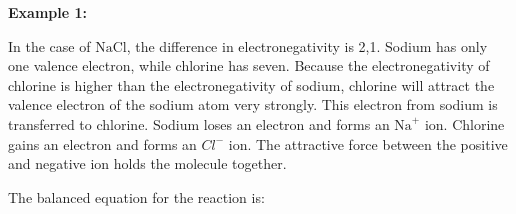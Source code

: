         \label{m38684*id142248}
          \textbf{Example 1:}
        \par 
        \label{m38684*id142255}In the case of \begin{math}\mathrm{NaCl}\end{math}, the difference in electronegativity is 2,1. Sodium has only one valence electron, while chlorine has seven. Because the electronegativity of chlorine is higher than the electronegativity of sodium, chlorine will attract the valence electron of the sodium atom very strongly. This electron from sodium is transferred to chlorine. Sodium loses an electron and forms an \begin{math}{\mathrm{Na}}^{+}\end{math} ion. Chlorine gains an electron and forms an \begin{math}{Cl}^{-}\end{math} ion. The attractive force between the positive and negative ion holds the molecule together.\par 
        \label{m38684*id142300}The balanced equation for the reaction is:\par 
        \label{m38684*id142305}\nopagebreak\noindent{}
    
